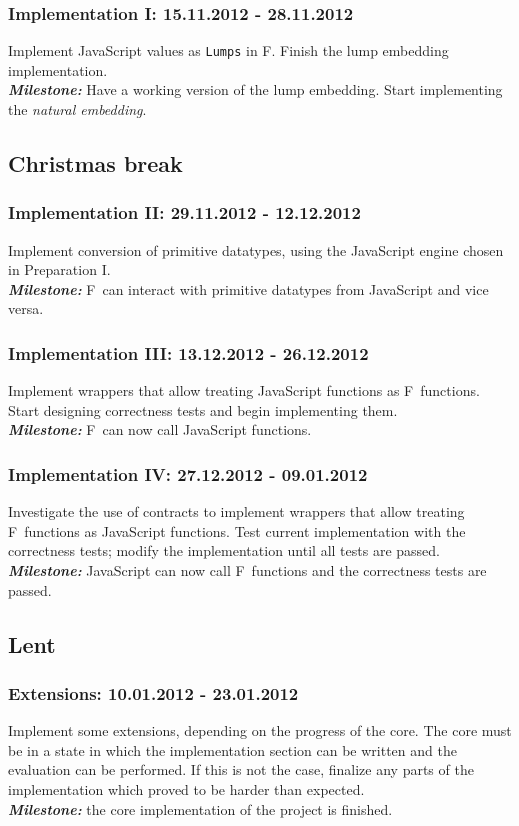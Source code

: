 \documentclass[12pt,a4paper, twoside]{article}
\newcommand{\fs}{F\nolinebreak\hspace{-.05em}\raisebox{.6ex}{\tiny\bf
    \#}}
\begin{document}
\subsubsection*{Implementation I: 15.11.2012 - 28.11.2012} Implement
JavaScript values as \texttt{Lumps} in \fs. Finish the lump embedding
implementation.  \\\textbf{\emph{Milestone:}} Have a working version
of the lump embedding.  Start implementing the \emph{natural
embedding}.

\subsection*{Christmas break}
\subsubsection*{Implementation II: 29.11.2012 - 12.12.2012} Implement
conversion of primitive datatypes, using the JavaScript engine chosen
in Preparation I.  \\\textbf{\emph{Milestone:}} \fs\ can interact with
primitive datatypes from JavaScript and vice versa.

\subsubsection*{Implementation III: 13.12.2012 - 26.12.2012} Implement
wrappers that allow treating JavaScript functions as \fs\ functions.
Start designing correctness tests and begin implementing them.
\\\textbf{\emph{Milestone:}} \fs\ can now call JavaScript functions.

\subsubsection*{Implementation IV: 27.12.2012 - 09.01.2012}
Investigate the use of contracts to implement wrappers that allow
treating \fs\ functions as JavaScript functions.  Test current
implementation with the correctness tests; modify the implementation
until all tests are passed.  \\\textbf{\emph{Milestone:}} JavaScript
can now call \fs\ functions and the correctness tests are passed.

\subsection*{Lent}
\subsubsection*{Extensions: 10.01.2012 - 23.01.2012} Implement some
extensions, depending on the progress of the core. The core must be in
a state in which the implementation section can be written and the
evaluation can be performed. If this is not the case, finalize any
parts of the implementation which proved to be harder than expected.
\\\textbf{\emph{Milestone:}} the core implementation of the project is
finished.
\end{document}
